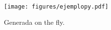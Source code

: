 \begin{figure}[bhtp]
\begin{center}
\texttt{[image: figures/ejemplopy.pdf]}
\caption{Generada on the fly.}
\label{fig:onthefly}
\end{center}
\end{figure}

